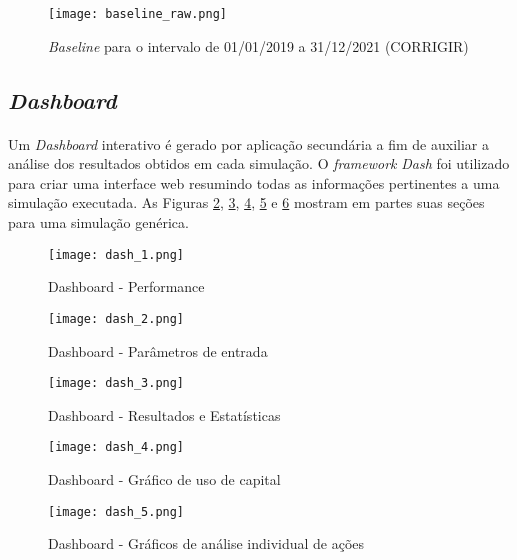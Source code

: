 \begin{figure}[h]
    \texttt{[image: baseline\_raw.png]}
    \centering
    \caption{\textit{Baseline} para o intervalo de 01/01/2019 a 31/12/2021 (CORRIGIR)}
    \label{fig:170}
\end{figure}

\subsection{\textit{Dashboard}}

\paragraph{} Um \textit{Dashboard} interativo é gerado por aplicação secundária a fim de auxiliar a análise dos resultados obtidos em cada simulação. O \textit{framework} \textit{Dash} \cite{dash} foi utilizado para criar uma interface web resumindo todas as informações pertinentes a uma simulação executada. As Figuras \ref{fig:171}, \ref{fig:172}, \ref{fig:173}, \ref{fig:174} e \ref{fig:175} mostram em partes suas seções para uma simulação genérica.

\begin{figure}[h]
    \texttt{[image: dash\_1.png]}
    \centering
    \caption{Dashboard - Performance}
    \label{fig:171}
\end{figure}

\begin{figure}[h]
    \texttt{[image: dash\_2.png]}
    \centering
    \caption{Dashboard - Parâmetros de entrada}
    \label{fig:172}
\end{figure}

\begin{figure}[h]
    \texttt{[image: dash\_3.png]}
    \centering
    \caption{Dashboard - Resultados e Estatísticas}
    \label{fig:173}
\end{figure}

\begin{figure}[h]
    \texttt{[image: dash\_4.png]}
    \centering
    \caption{Dashboard - Gráfico de uso de capital}
    \label{fig:174}
\end{figure}

\begin{figure}[h]
    \texttt{[image: dash\_5.png]}
    \centering
    \caption{Dashboard - Gráficos de análise individual de ações }
    \label{fig:175}
\end{figure}